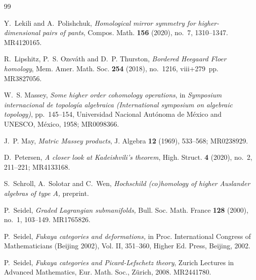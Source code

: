\documentclass[a4paper, reqno, 11pt]{amsart}
\theoremstyle{definition}
\begin{document}
\begin{thebibliography}{99}
	
	
	
	Y.~Lekili and A.~Polishchuk,
	\emph{Homological mirror symmetry for higher-dimensional pairs of pants},
	Compos. Math. \textbf{156} (2020), no.~7, 1310--1347. MR4120165.
	
	R.~Lipshitz, P.~S. Ozsv\'{a}th and D.~P. Thurston,
	\emph{Bordered Heegaard Floer homology},
	Mem. Amer. Math. Soc. \textbf{254} (2018), no.~1216, viii+279~pp. MR3827056.
	
	W.~S. Massey,
	\emph{Some higher order cohomology operations},
	in {\it Symposium internacional de topolog\'ia algebraica (International symposium on algebraic topology)},
	pp.~145--154,
	Universidad Nacional Aut\'onoma de M\'exico and UNESCO, M\'exico, 1958; MR0098366.
	
	J.~P. May,
	\emph{Matric Massey products},
	J. Algebra \textbf{12} (1969), 533--568; MR0238929.
	
	
	D.~Petersen,
	\emph{A closer look at Kadeishvili's theorem},
	High. Struct. \textbf{4} (2020), no.~2, 211--221; MR4133168.
	
	S.~Schroll, A.~Solotar and C.~Wen,
	\emph{Hochschild (co)homology of higher Auslander algebras of type $A$,} preprint. 
	
	P.~Seidel, 
	\emph{Graded Lagrangian submanifolds,} Bull. Soc. Math. France \textbf{128} (2000), no.~1, 103--149. MR1765826.
	
	P.~Seidel,
	\emph{Fukaya categories and deformations,} in Proc. International Congress of Mathematicians (Beijing 2002), Vol. II, 351--360, Higher Ed. Press, Beijing, 2002.
	
	
	P.~Seidel,
	\emph{Fukaya categories and Picard-Lefschetz theory},
	Zurich Lectures in Advanced Mathematics,
	Eur. Math. Soc., Z\"urich, 2008.
	MR2441780.
	

\end{thebibliography}
\end{document}
